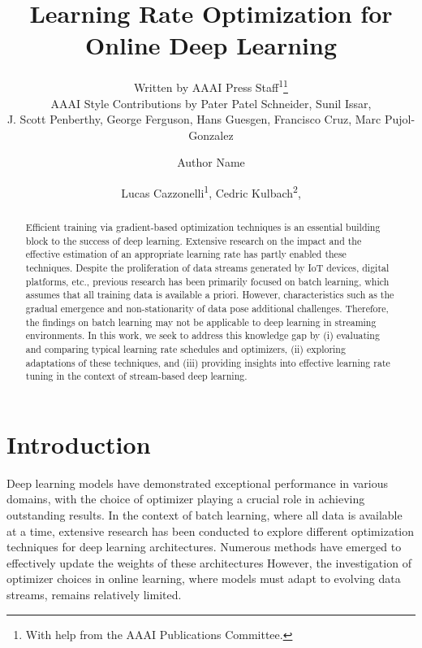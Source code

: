 \documentclass[letterpaper]{article} %
\author{
    Written by AAAI Press Staff\textsuperscript{\rm 1}\thanks{With help from the AAAI Publications Committee.}\\
    AAAI Style Contributions by Pater Patel Schneider,
    Sunil Issar,\\
    J. Scott Penberthy,
    George Ferguson,
    Hans Guesgen,
    Francisco Cruz\equalcontrib,
    Marc Pujol-Gonzalez\equalcontrib}
\author{
    Author Name
}
\title{Learning Rate Optimization for Online Deep Learning}
\author{
    Lucas Cazzonelli\textsuperscript{\rm 1},
    Cedric Kulbach\textsuperscript{\rm 2},
}
\begin{document}
\maketitle


\begin{abstract}

	\noindent Efficient training via gradient-based optimization techniques is an essential building block to the success of deep learning. Extensive research on the impact and the effective estimation of an appropriate learning rate has partly enabled these techniques. Despite the proliferation of data streams generated by IoT devices, digital platforms, etc., previous research has been primarily focused on batch learning, which assumes that all training data is available a priori. However, characteristics such as the gradual emergence and non-stationarity of data pose additional challenges. Therefore, the findings on batch learning may not be applicable to deep learning in streaming environments. In this work, we seek to address this knowledge gap by (i) evaluating and comparing typical learning rate schedules and optimizers, (ii) exploring adaptations of these techniques, and (iii) providing insights into effective learning rate tuning in the context of stream-based deep learning.


\end{abstract}

\section{Introduction}
Deep learning models have demonstrated exceptional performance in various domains, with the choice of optimizer playing a crucial role in achieving outstanding results.
In the context of batch learning, where all data is available at a time, extensive research has been conducted to explore different optimization techniques for deep learning architectures.
Numerous methods have emerged to effectively update the weights of these architectures
However, the investigation of optimizer choices in online learning, where models must adapt to evolving data streams, remains relatively limited.
\end{document}
